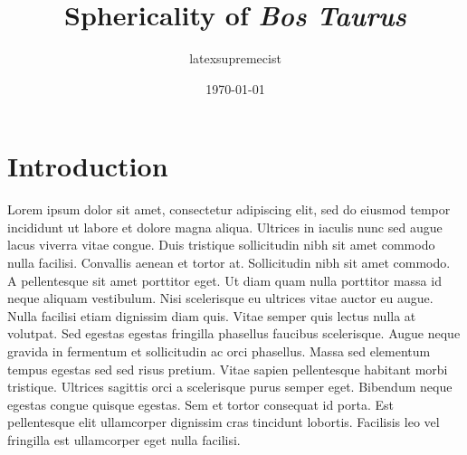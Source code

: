 \documentclass[twocolumn]{article}
\title{Sphericality of \textit{Bos Taurus}}
\author{latexsupremecist}
\date{\today}
\begin{document}
\bigskip

\section{Introduction}
Lorem ipsum dolor sit amet, consectetur adipiscing elit, sed do eiusmod tempor incididunt ut labore et dolore magna aliqua. Ultrices in iaculis nunc sed augue lacus viverra vitae congue. Duis tristique sollicitudin nibh sit amet commodo nulla facilisi. Convallis aenean et tortor at. Sollicitudin nibh sit amet commodo. A pellentesque sit amet porttitor eget. Ut diam quam nulla porttitor massa id neque aliquam vestibulum. Nisi scelerisque eu ultrices vitae auctor eu augue. Nulla facilisi etiam dignissim diam quis. Vitae semper quis lectus nulla at volutpat. Sed egestas egestas fringilla phasellus faucibus scelerisque. Augue neque gravida in fermentum et sollicitudin ac orci phasellus. Massa sed elementum tempus egestas sed sed risus pretium. Vitae sapien pellentesque habitant morbi tristique. Ultrices sagittis orci a scelerisque purus semper eget. Bibendum neque egestas congue quisque egestas. Sem et tortor consequat id porta. Est pellentesque elit ullamcorper dignissim cras tincidunt lobortis. Facilisis leo vel fringilla est ullamcorper eget nulla facilisi.
\end{document}
